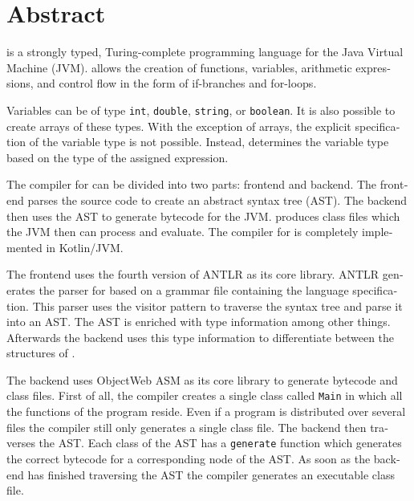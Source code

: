 \chapter{Abstract}

\begin{english} %
\Toya is a strongly typed, Turing-complete programming language for the Java Virtual Machine (JVM). \Toya allows the creation of functions, variables, arithmetic expressions, and control flow in the form of if-branches and for-loops.

Variables can be of type \texttt{int}, \texttt{double}, \texttt{string}, or \texttt{boolean}. It is also possible to create arrays of these types. With the exception of arrays, the explicit specification of the variable type is not possible. Instead, \toya determines the variable type based on the type of the assigned expression.

The compiler for \toya can be divided into two parts: frontend and backend. The frontend parses the source code to create an abstract syntax tree (AST). The backend then uses the AST to generate bytecode for the JVM. \Toya produces class files which the JVM then can process and evaluate. The compiler for \toya is completely implemented in Kotlin/JVM. 

The frontend uses the fourth version of ANTLR as its core library. ANTLR generates the parser for \toya based on a grammar file containing the language specification. This parser uses the visitor pattern to traverse the syntax tree and parse it into an AST. The AST is enriched with type information among other things. Afterwards the backend uses this type information to differentiate between the structures of \toya.

The backend uses ObjectWeb ASM as its core library to generate bytecode and class files. First of all, the compiler creates a single class called \texttt{Main} in which all the functions of the program reside. Even if a \toya program is distributed over several files the compiler still only generates a single class file. The backend then traverses the AST. Each class of the AST has a \texttt{generate} function which generates the correct bytecode for a corresponding node of the AST. As soon as the backend has finished traversing the AST the \toya compiler generates an executable class file.
\end{english}

